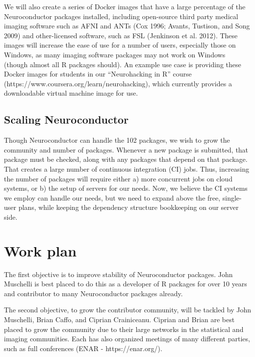 \documentclass[]{elsarticle} %
\begin{document}
We will also create a series of Docker images that have a large percentage of the Neuroconductor packages installed, including open-source third party medical imaging software such as AFNI and ANTs (Cox 1996; Avants, Tustison, and Song 2009) and other-licensed software, such as FSL (Jenkinson et al. 2012). These images will increase the ease of use for a number of users, especially those on Windows, as many imaging software packages may not work on Windows (though almost all R packages should). An example use case is providing these Docker images for students in our ``Neurohacking in R'' course (https://www.coursera.org/learn/neurohacking), which currently provides a downloadable virtual machine image for use.

\hypertarget{scaling-neuroconductor}{%
\subsection{Scaling Neuroconductor}\label{scaling-neuroconductor}}

Though Neuroconductor can handle the 102 packages, we wish to grow the community and number of packages. Whenever a new package is submitted, that package must be checked, along with any packages that depend on that package. That creates a large number of continuous integration (CI) jobs. Thus, increasing the number of packages will require either a) more concurrent jobs on cloud systems, or b) the setup of servers for our needs. Now, we believe the CI systems we employ can handle our needs, but we need to expand above the free, single-user plans, while keeping the dependency structure bookkeeping on our server side.

\hypertarget{work-plan}{%
\section{Work plan}\label{work-plan}}

The first objective is to improve stability of Neuroconductor packages. John Muschelli is best placed to do this as a developer of R packages for over 10 years and contributor to many Neuroconductor packages already.

The second objective, to grow the contributor community, will be tackled by
John Muschelli, Brian Caffo, and Ciprian Crainiceanu. Ciprian and Brian are best placed to grow the community due to their large networks in the statistical and imaging communities. Each has also organized meetings of many different parties, such as full conferences (ENAR - https://enar.org/).
\end{document}
